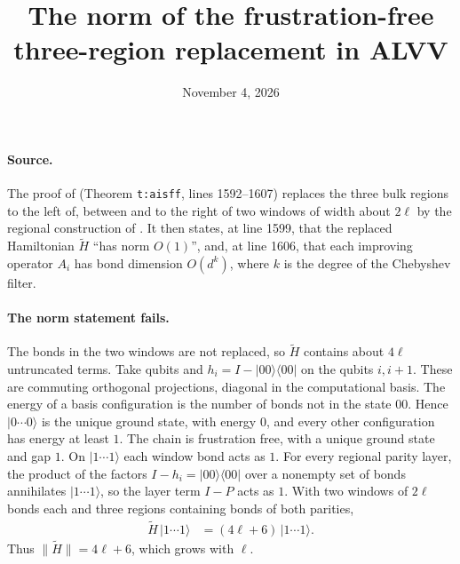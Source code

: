 \documentclass{article}
\title{The norm of the frustration-free three-region replacement in ALVV}
\author{}
\date{November 4, 2026}
\begin{document}
\maketitle
{}

\paragraph{Source.}
The proof of \cite[Theorem~5.15]{Arad2016RigorousRG} (Theorem \texttt{t:aisff},
lines 1592--1607) replaces the three bulk regions to the left of, between and to
the right of two windows of width about $2\ell$ by the regional construction of
\cite[Definition~5.10]{Arad2016RigorousRG}. It then states, at line 1599, that the
replaced Hamiltonian $\widetilde H$ ``has norm $O(1)$'', and, at line 1606, that
each improving operator $A_i$ has bond dimension $O(d^k)$, where $k$ is the
degree of the Chebyshev filter.

\paragraph{The norm statement fails.}
The bonds in the two windows are not replaced, so $\widetilde H$ contains about
$4\ell$ untruncated terms. Take qubits and
$h_i=I-|00\rangle\langle00|$ on the qubits $i,i+1$. These are commuting
orthogonal projections, diagonal in the computational basis. The energy of a
basis configuration is the number of bonds not in the state $00$. Hence
$|0\cdots0\rangle$ is the unique ground state, with energy $0$, and every other
configuration has energy at least $1$. The chain is frustration free, with a
unique ground state and gap $1$.
On $|1\cdots1\rangle$ each window bond acts as $1$. For every regional
parity layer, the product of the factors $I-h_i=|00\rangle\langle00|$ over a
nonempty set of bonds annihilates $|1\cdots1\rangle$, so the layer term
$I-P$ acts as $1$. With two windows of $2\ell$ bonds each and three regions
containing bonds of both parities,
\begin{align}
    \widetilde H\,|1\cdots1\rangle & =(4\ell+6)\,|1\cdots1\rangle.
    \label{eq:alvv_ff_norm_example}
\end{align}
Thus $\|\widetilde H\|=4\ell+6$, which grows with $\ell$.
\end{document}
